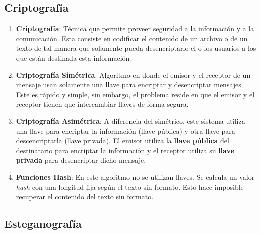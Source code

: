 \documentclass[12pt, a4paper]{article} %
\begin{document}
\subsection{Criptografía}

\begin{enumerate}[resume*]
	\item \textbf{Criptografía}: Técnica que permite proveer seguridad a la información y a la comunicación. Esta consiste en codificar el contenido de un archivo o de un texto de tal manera que solamente pueda desencriptarlo el o los usuarios a los que están destinada esta información.
	
	\item \textbf{Criptografía Símétrica}: Algoritmo en donde el emisor y el receptor de un mensaje usan solamente una llave para encriptar y desencriptar mensajes. Este es rápido y simple, sin embargo, el problema reside en que el emisor y el receptor tienen que intercambiar llaves de forma segura.
	
	\item \textbf{Criptografía Asimétrica}: A diferencia del simétrico, este sistema utiliza una llave para encriptar la información (llave pública) y otra llave para descencriptarla (llave privada). El emisor utiliza la \textbf{llave pública} del destinatario para encriptar la información y el receptor utiliza su \textbf{llave privada} para desencriptar dicho mensaje.
	
	\item \textbf{Funciones Hash}: En este algoritmo no se utilizan llaves. Se calcula un valor \textit{hash} con una longitud fija según el texto sin formato. Esto hace imposible recuperar el contenido del texto sin formato.
\end{enumerate}
\nocite{*} %

\subsection{Esteganografía}
\end{document}
